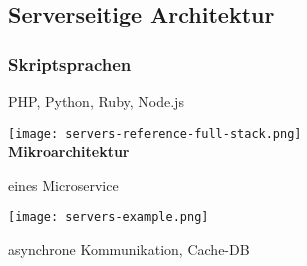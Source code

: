\subsection{Serverseitige Architektur}

\subsubsection{Skriptsprachen}

PHP, Python, Ruby, Node.js

\texttt{[image: servers-reference-full-stack.png]} \\

\textbf{Mikroarchitektur}

eines Microservice

\texttt{[image: servers-example.png]}

asynchrone Kommunikation, Cache-DB
